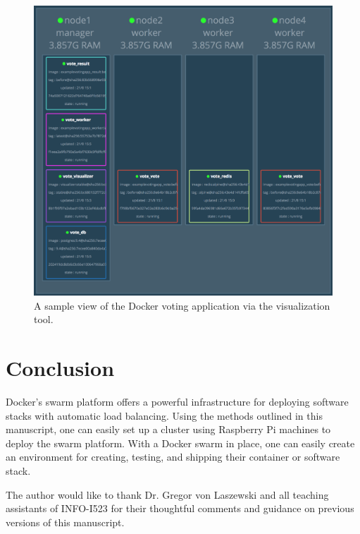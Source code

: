\documentclass[sigconf]{acmart}
\begin{document}
\begin{figure}[!ht]
  \centering\includegraphics[width=\columnwidth]{images/votingApp2.png}
  \caption{A sample view of the Docker voting application via the  visualization tool.}\label{f:votingApp2}
\end{figure}

\section{Conclusion}

Docker's swarm platform offers a powerful infrastructure for deploying software stacks with automatic load balancing. Using 
the methods outlined in this manuscript, one can easily set up a cluster using Raspberry Pi machines to deploy the swarm 
platform. With a Docker swarm in place, one can easily create an environment for creating, testing, and shipping their 
container or software stack.


\begin{acks}

The author would like to thank Dr. Gregor von Laszewski and all teaching assistants of INFO-I523 for their thoughtful 
comments and guidance on previous versions of this manuscript.

\end{acks}


 
\end{document}
